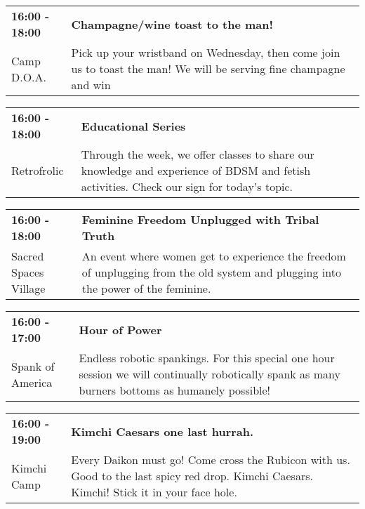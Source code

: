 \begin{tabular}{ p{1in} p{2.2in} }
    \textbf{16:00 - 18:00} & \textbf{Champagne/wine toast to the man!} \\
    Camp D.O.A. \newline  & Pick up your wristband on Wednesday, then come join us to toast the man! We will be serving fine champagne and win \\
    \hline 
\end{tabular}
    
\begin{tabular}{ p{1in} p{2.2in} }
    \textbf{16:00 - 18:00} & \textbf{Educational Series} \\
    Retrofrolic \newline  & Through the week, we offer classes to share our knowledge and experience of BDSM and fetish activities.  Check our sign for today's topic. \\
    \hline 
\end{tabular}
    
\begin{tabular}{ p{1in} p{2.2in} }
    \textbf{16:00 - 18:00} & \textbf{Feminine Freedom Unplugged with Tribal Truth} \\
    Sacred Spaces Village \newline  & An event where women get to experience the freedom of unplugging from the old system and plugging into the power of the feminine. \\
    \hline 
\end{tabular}
    
\begin{tabular}{ p{1in} p{2.2in} }
    \textbf{16:00 - 17:00} & \textbf{Hour of Power} \\
    Spank of America \newline  & Endless robotic spankings. For this special one hour session we will continually robotically spank as many burners bottoms as humanely possible! \\
    \hline 
\end{tabular}
    
\begin{tabular}{ p{1in} p{2.2in} }
    \textbf{16:00 - 19:00} & \textbf{Kimchi Caesars one last hurrah.} \\
    Kimchi Camp \newline  & Every Daikon must go! Come cross the Rubicon with us. Good to the last spicy red drop. Kimchi Caesars. Kimchi! Stick it in your face hole. \\
    \hline 
\end{tabular}
    
